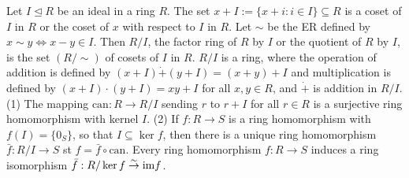  Let $I \trianglelefteq R$ be an ideal in a ring $R$. The set $x + I := \{x + i : i \in I\} \subseteq R$ is a coset of $I$ in $R$ or the coset of $x$ with respect to $I$ in $R$.
 Let $\sim$ be the ER defined by $x \sim y \Leftrightarrow x - y \in I$. Then $R/I$, the factor ring of $R$ by $I$ or the quotient of $R$ by $I$, is the set $(R/\sim)$ of cosets of $I$ in $R$.
 $R/I$ is a ring, where the operation of addition is defined by $(x + I) \dot{+} (y + I) = (x + y) + I$ and multiplication is defined by $(x + I)\cdot(y + I) = xy + I$ for all $x, y \in R$, and $\dot{+}$ is addition in $R/I$.
(1) The mapping $\text{can} : R \rightarrow R/I$ sending $r$ to $r + I$ for all $r \in R$ is a surjective ring homomorphism with kernel $I$.
(2) If $f : R \to S$ is a ring homomorphism with $f(I) = \{0_S\}$, so that $I \subseteq \ker f$, then there is a unique ring homomorphism $\bar{f} : R/I \to S$ st $f = \bar{f} \circ \text{can}$.
 Every ring homomorphism $f : R \to S$ induces a ring isomorphism $\bar{f} : R/\ker f \stackrel{\sim}{\to} \text{im} f$.